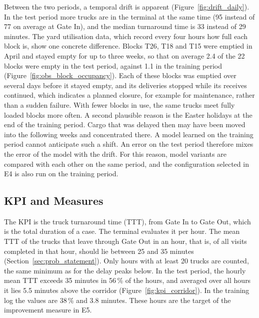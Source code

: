 Between the two periods, a temporal drift is apparent (Figure~\ref{fig:drift_daily}).
In the test period more trucks are in the terminal at the same time (95 instead of
77 on average at Gate In), and the median turnaround time is 33 instead of 29
minutes. The yard utilisation data, which record every four hours how full each
block is, show one concrete difference. Blocks T26, T18 and T15 were emptied in
April and stayed empty for up to three weeks, so that on average 2.4 of the 22
blocks were empty in the test period, against 1.1 in the training period
(Figure~\ref{fig:obs_block_occupancy}). Each of these blocks was emptied over several
days before it stayed empty, and its deliveries stopped while its receives continued,
which indicates a planned closure, for example for maintenance, rather than a sudden
failure. With fewer blocks in use, the same trucks meet fully
loaded blocks more often. A second plausible reason is the Easter holidays at the
end of the training period. Cargo that was delayed then may have been moved into
the following weeks and concentrated there. A model learned on the training period
cannot anticipate such a shift. An error on the test period therefore mixes the
error of the model with the drift. For this reason, model variants are compared
with each other on the same period, and the configuration selected in E4 is also
run on the training period.

\subsection{KPI and Measures}
\label{sec:exp_kpis}

The KPI is the truck turnaround time (TTT), from Gate In to Gate Out, which is the
total duration of a case. The terminal evaluates it per hour. The mean TTT of the
trucks that leave through Gate Out in an hour, that is, of all visits completed in
that hour, should lie between 25 and 35 minutes
(Section~\ref{sec:prob_statement}). Only hours with at least 20 trucks are counted,
the same minimum as for the delay peaks below. In the test period, the hourly mean
TTT exceeds 35 minutes in 56\,\% of the hours, and averaged over all hours it lies
5.5 minutes above the corridor (Figure~\ref{fig:kpi_corridor}). In the training log
the values are 38\,\% and 3.8 minutes. These hours are the target of the improvement
measure in E5.

